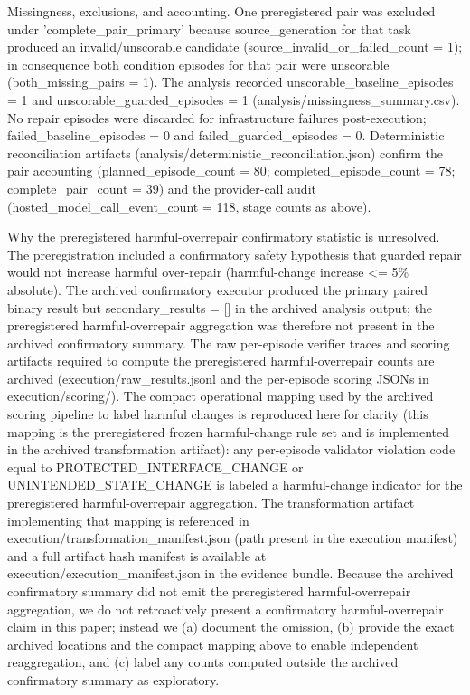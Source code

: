 \documentclass[conference]{IEEEtran}
\begin{document}
Missingness, exclusions, and accounting. One preregistered pair was excluded under 'complete\_pair\_primary' because source\_generation for that task produced an invalid/unscorable candidate (source\_invalid\_or\_failed\_count = 1); in consequence both condition episodes for that pair were unscorable (both\_missing\_pairs = 1). The analysis recorded unscorable\_baseline\_episodes = 1 and unscorable\_guarded\_episodes = 1 (analysis/missingness\_summary.csv). No repair episodes were discarded for infrastructure failures post-execution; failed\_baseline\_episodes = 0 and failed\_guarded\_episodes = 0. Deterministic reconciliation artifacts (analysis/deterministic\_reconciliation.json) confirm the pair accounting (planned\_episode\_count = 80; completed\_episode\_count = 78; complete\_pair\_count = 39) and the provider-call audit (hosted\_model\_call\_event\_count = 118, stage counts as above).

Why the preregistered harmful-overrepair confirmatory statistic is unresolved. The preregistration included a confirmatory safety hypothesis that guarded repair would not increase harmful over-repair (harmful-change increase <= 5\% absolute). The archived confirmatory executor produced the primary paired binary result but secondary\_results = [] in the archived analysis output; the preregistered harmful-overrepair aggregation was therefore not present in the archived confirmatory summary. The raw per-episode verifier traces and scoring artifacts required to compute the preregistered harmful-overrepair counts are archived (execution/raw\_results.jsonl and the per-episode scoring JSONs in execution/scoring/). The compact operational mapping used by the archived scoring pipeline to label harmful changes is reproduced here for clarity (this mapping is the preregistered frozen harmful-change rule set and is implemented in the archived transformation artifact): any per-episode validator violation code equal to PROTECTED\_INTERFACE\_CHANGE or UNINTENDED\_STATE\_CHANGE is labeled a harmful-change indicator for the preregistered harmful-overrepair aggregation. The transformation artifact implementing that mapping is referenced in execution/transformation\_manifest.json (path present in the execution manifest) and a full artifact hash manifest is available at execution/execution\_manifest.json in the evidence bundle. Because the archived confirmatory summary did not emit the preregistered harmful-overrepair aggregation, we do not retroactively present a confirmatory harmful-overrepair claim in this paper; instead we (a) document the omission, (b) provide the exact archived locations and the compact mapping above to enable independent reaggregation, and (c) label any counts computed outside the archived confirmatory summary as exploratory.
\end{document}
